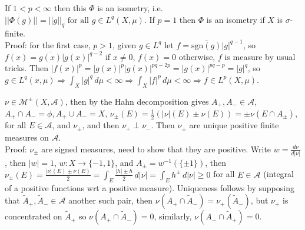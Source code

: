 \documentclass[12pt]{article}
\newcommand{\partset}[1]{ \mathcal{P}^{*}(#1) }
\newcommand{\fall}[0] { \textrm{ for all } }
\newcommand{\rimply}[0] { \Rightarrow }
\newcommand{\rarw}[0] { \rightarrow }
\newcommand{\nats}[0] { \mathbb{N}}
\newcommand{\A}[0] { \mathcal{A} }
\newcommand{\M}[0] { \mathcal{M} }
\begin{document}
If $1 < p < \infty$ then this $\Phi$ is an isometry, i.e. $||\Phi(g)|| = ||g||_q \fall g \in L^q(X, \mu)$. If $p=1$ then $\Phi$ is an isometry if $X$ is $\sigma$-finite. \\

\noindent
Proof: for the first case, $p > 1$, given $g \in L^q$ let $f = \overline{\textrm{sgn}(g)} |g|^{q-1}$, so $ f(x) = \overline{g(x)} |g(x)|^{q-2}$ if $x \not = 0$, $f(x) = 0$ otherwise, $f$ is measure by usual tricks. Then $|f(x)|^p = |g(x)|^p |g(x)|^{pq-2p} = |g(x)|^{pq-p} = |g|^q$, so $g \in L^q(x, \mu) \rimply \int_X |g|^q \, d\mu  < \infty \rimply \int_X |f|^p \, d\mu < \infty \rimply f \in L^p(X, \mu)$. 












\break


$\nu \in \M^\pm(X, \A)$, then by the Hahn decomposition gives $A_+, A_- \in \A$, $A_+ \cap A_- = \phi, A_+ \cup A_- = X$, $\nu_\pm(E) = \frac{1}{2} \left( |\nu|(E) \pm \nu(E) \right) =  \pm \nu( E \cap A_\pm)$, for all $E \in \A$, and $\nu_\pm$, and then $\nu_+ \perp \nu_-$. Then $\nu_\pm$ are unique positive finite measures on $\A$. \\

\noindent
Proof: $\nu_\pm$ are signed measures, need to show that they are positive. Write $w = \frac{d\nu}{d|\nu|}$, then $|w| = 1$, $w:X \rarw \{-1,1\}$, and $A_\pm = w^{-1}(\{\pm 1\})$, then 
$\nu_\pm(E) = \frac{|\nu|(E) \pm \nu(E)}{2} = \int_E \frac{|h| \pm h}{2} \, d|\nu| = \int_E h^\pm \, d|\nu| \ge 0$ for all $E \in \A$ (integral of a positive functions wrt a positive measure). Uniqueness follows by supposing that $\tilde{A}_+, \tilde{A}_- \in \A$ another such pair, then $\nu(A_+ \cap \tilde{A}_-) = \nu_+(\tilde{A}_-)$, but $\nu_+$ is concentrated on $\tilde{A}_+$ so $\nu(A_+ \cap \tilde{A}_-) = 0$, similarly, $\nu(A_- \cap \tilde{A}_+) = 0$. \\

\end{document}
